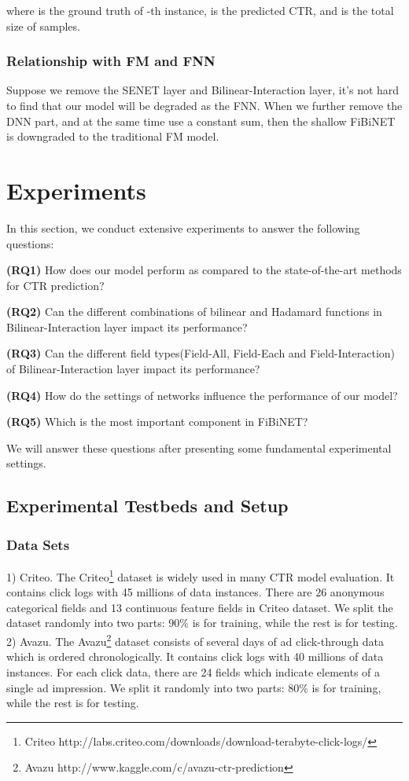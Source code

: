 \documentclass[sigconf]{acmart}
\begin{document}
where  is the ground truth of -th instance,  is
the predicted CTR, and  is the total size of samples.

\subsubsection{Relationship with FM and FNN} Suppose we remove the SENET layer and Bilinear-Interaction layer, it's not hard to find that our model will be degraded as the FNN. When we further remove the DNN part, and at the same time use a constant sum, then the shallow FiBiNET is downgraded to the traditional FM model.
\section{Experiments}
\label{sec:s4}
In this section, we conduct extensive experiments to answer the
following questions:

\noindent\textbf{(RQ1)} How does our model perform as compared to the
state-of-the-art methods for CTR prediction?

\noindent\textbf{(RQ2)} Can the different combinations of bilinear and Hadamard functions in Bilinear-Interaction layer impact its performance?

\noindent\textbf{(RQ3)} Can the different field types(Field-All, Field-Each and Field-Interaction) of Bilinear-Interaction layer impact its
performance?

\noindent\textbf{(RQ4)} How do the settings of networks influence the performance
of our model?

\noindent\textbf{(RQ5)} Which is the most important component in FiBiNET?


We will answer these questions after presenting some fundamental
experimental settings.
\subsection{Experimental Testbeds and Setup}
\subsubsection{Data Sets} 1) Criteo.
The Criteo\footnote{Criteo
  http://labs.criteo.com/downloads/download-terabyte-click-logs/}
dataset is widely used in many CTR model evaluation. It contains click
logs with 45 millions of data instances. There are 26 anonymous
categorical fields and 13 continuous feature fields in Criteo dataset.
We split the dataset randomly into two parts: 90\% is for training,
while the rest is for testing. 2) Avazu. The Avazu\footnote{Avazu http://www.kaggle.com/c/avazu-ctr-prediction}
dataset consists of several days of ad click-through data which is
ordered chronologically. It contains click logs with 40 millions of data
instances. For each click data, there are 24 fields which indicate
elements of a single ad impression. We split it randomly into two parts:
80\% is for training, while the rest is for testing.
\end{document}
